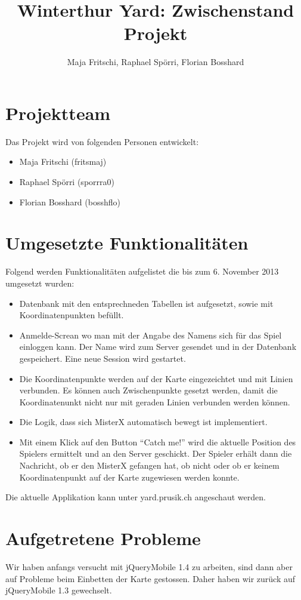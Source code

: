 \documentclass[11pt]{article}
\title{Winterthur Yard: Zwischenstand Projekt}
\author{Maja Fritschi, Raphael Spörri, Florian Bosshard}
\date{}
\begin{document}
\maketitle

\tableofcontents
\newpage

\section{Projektteam}
Das Projekt wird von folgenden Personen entwickelt:
\begin{itemize}
\item Maja Fritschi (fritsmaj)
\item Raphael Spörri (sporrra0)
\item Florian Bosshard (bosshflo)
\end{itemize}


\section{Umgesetzte Funktionalitäten}
Folgend werden Funktionalitäten aufgelistet die bis zum 6. November 2013 umgesetzt wurden: 
\begin{itemize}
\item Datenbank mit den entsprechneden Tabellen ist aufgesetzt, sowie mit Koordinatenpunkten befüllt.
\item Anmelde-Screan wo man mit der Angabe des Namens sich für das Spiel einloggen kann. Der Name wird zum Server gesendet und in der Datenbank gespeichert. Eine neue Session wird gestartet.
\item Die Koordinatenpunkte werden auf der Karte eingezeichtet und mit Linien verbunden. Es können auch Zwischenpunkte gesetzt werden, damit die Koordinatenunkt nicht nur mit geraden Linien verbunden werden können.
\item Die Logik, dass sich MisterX automatisch bewegt ist implementiert.
\item Mit einem Klick auf den Button ``Catch me!'' wird die aktuelle Position des Spielers ermittelt und an den Server geschickt. Der Spieler erhält dann die Nachricht, ob er den MisterX gefangen hat, ob nicht oder ob er keinem Koordinatenpunkt auf der Karte zugewiesen werden konnte.
\end{itemize}

Die aktuelle Applikation kann unter yard.prusik.ch angeschaut werden. 

\section{Aufgetretene Probleme}
Wir haben anfangs versucht mit jQueryMobile 1.4 zu arbeiten, sind dann aber auf Probleme beim Einbetten der Karte gestossen. Daher haben wir zurück auf jQueryMobile 1.3 gewechselt.
\end{document}
